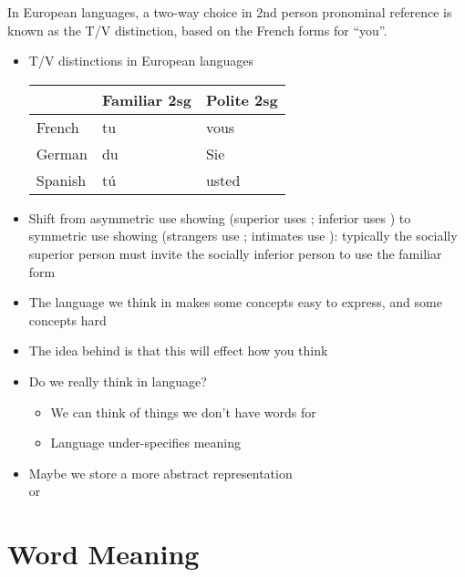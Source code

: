 \documentclass[headrule,footrule]{foils}
\begin{document}

In European languages, a two-way choice in 2nd person pronominal
reference is known as the T/V distinction, based on the French forms
for ``you''.

\begin{itemize}
\item T/V distinctions in European languages
\\[2ex]  \begin{tabular}{lll}
    & Familiar 2sg & Polite 2sg \\ \hline
    French & tu & vous \\
    German & du & Sie \\
    Spanish & t\'u & usted
  \end{tabular}

\item Shift from asymmetric use showing  (superior uses ; inferior uses ) to symmetric use showing  (strangers use  ; intimates use ): typically the socially superior person must invite the socially
  inferior person to use the familiar form
\end{itemize}






\begin{itemize}
\item The language we think in makes some concepts easy to express,
  and some concepts hard
\item The idea behind  is that this will
  effect how you think
\item Do we really think in language? 
  \begin{itemize}
  \item We can think of things we don't have words for
  \item Language under-specifies meaning
  \end{itemize}
\item Maybe we store a more abstract representation
\\  or 
\end{itemize}

\section{Word Meaning}
\end{document}
